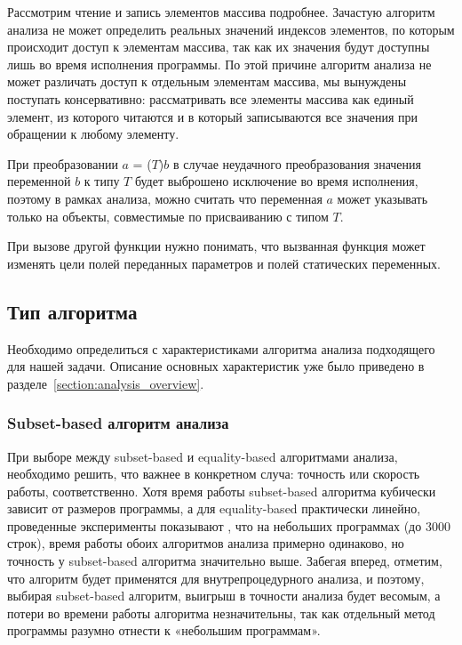 \documentclass[14pt,titlepage]{extarticle}
\newcommand{\eng}[1]{{\English#1}}
\begin{document}
      Рассмотрим чтение и запись элементов массива подробнее. Зачастую
      алгоритм анализа не может определить реальных значений индексов
      элементов, по которым происходит доступ к элементам массива, так как их
      значения будут доступны лишь во время исполнения программы. По этой
      причине алгоритм анализа не может различать доступ к отдельным элементам
      массива, мы вынуждены поступать консервативно: рассматривать все элементы
      массива как единый элемент, из которого читаются и в который записываются
      все значения при обращении к любому элементу.

      При преобразовании $a$ = ($T$)$b$ в случае неудачного преобразования
      значения переменной $b$ к типу $T$ будет выброшено исключение во время
      исполнения, поэтому в рамках анализа, можно считать что переменная $a$
      может указывать только на объекты, совместимые по присваиванию с типом
      $T$.

      При вызове другой функции нужно понимать, что вызванная функция может
      изменять цели полей переданных параметров и полей статических переменных.


    \subsection{Тип алгоритма}

      Необходимо определиться с характеристиками алгоритма анализа
      подходящего для нашей задачи. Описание основных характеристик уже было
      приведено в разделе~\ref{section:analysis_overview}.

    \subsubsection{\eng{Subset-based} алгоритм анализа}

      При выборе между \eng{subset-based} и \eng{equality-based} алгоритмами
      анализа, необходимо решить, что важнее в конкретном случа:
      точность или скорость работы, соответственно.
      Хотя время работы \eng{subset-based} алгоритма кубически зависит от
      размеров программы, а для \eng{equality-based} практически линейно,
      проведенные эксперименты показывают \cite{shapiro_fast_and_accurate}, что
      на небольших программах (до 3000 строк), время работы обоих алгоритмов
      анализа примерно одинаково, но точность у \eng{subset-based} алгоритма
      значительно выше.
      Забегая вперед, отметим, что алгоритм будет применятся для
      внутрепроцедурного анализа, и поэтому, выбирая \eng{subset-based}
      алгоритм, выигрыш в точности анализа будет весомым, а потери во времени
      работы алгоритма незначительны, так как отдельный метод программы
      разумно отнести к «небольшим программам».
\end{document}
